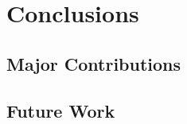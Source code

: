 \chapter{Conclusions}
\label{cha:conclusions}

\cite{DLhandbook-07}

\section{Major Contributions}
\label{sec:major-contributions}

\section{Future Work}
\label{sec:future-work}



